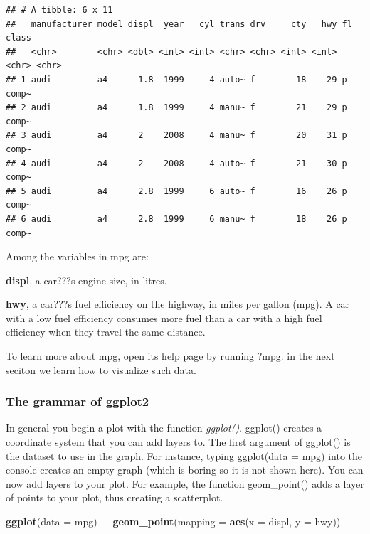 \documentclass[]{article}
\newenvironment{Shaded}{\begin{snugshade}}{\end{snugshade}}
\newcommand{\DataTypeTok}[1]{\textcolor[rgb]{0.13,0.29,0.53}{#1}}
\newcommand{\KeywordTok}[1]{\textcolor[rgb]{0.13,0.29,0.53}{\textbf{#1}}}
\newcommand{\NormalTok}[1]{#1}
\newcommand{\OperatorTok}[1]{\textcolor[rgb]{0.81,0.36,0.00}{\textbf{#1}}}
\newcommand{\StringTok}[1]{\textcolor[rgb]{0.31,0.60,0.02}{#1}}
\begin{document}
\begin{verbatim}
## # A tibble: 6 x 11
##   manufacturer model displ  year   cyl trans drv     cty   hwy fl    class
##   <chr>        <chr> <dbl> <int> <int> <chr> <chr> <int> <int> <chr> <chr>
## 1 audi         a4      1.8  1999     4 auto~ f        18    29 p     comp~
## 2 audi         a4      1.8  1999     4 manu~ f        21    29 p     comp~
## 3 audi         a4      2    2008     4 manu~ f        20    31 p     comp~
## 4 audi         a4      2    2008     4 auto~ f        21    30 p     comp~
## 5 audi         a4      2.8  1999     6 auto~ f        16    26 p     comp~
## 6 audi         a4      2.8  1999     6 manu~ f        18    26 p     comp~
\end{verbatim}

Among the variables in mpg are:

\textbf{displ}, a car???s engine size, in litres.

\textbf{hwy}, a car???s fuel efficiency on the highway, in miles per
gallon (mpg). A car with a low fuel efficiency consumes more fuel than a
car with a high fuel efficiency when they travel the same distance.

To learn more about mpg, open its help page by running ?mpg. in the next
seciton we learn how to visualize such data.

\hypertarget{the-grammar-of-ggplot2}{%
\subsubsection{The grammar of ggplot2}\label{the-grammar-of-ggplot2}}

In general you begin a plot with the function \emph{ggplot()}. ggplot()
creates a coordinate system that you can add layers to. The first
argument of ggplot() is the dataset to use in the graph. For instance,
typing ggplot(data = mpg) into the console creates an empty graph (which
is boring so it is not shown here). You can now add layers to your plot.
For example, the function geom\_point() adds a layer of points to your
plot, thus creating a scatterplot.

\begin{Shaded}
\begin{Highlighting}[]
\KeywordTok{ggplot}\NormalTok{(}\DataTypeTok{data =}\NormalTok{ mpg) }\OperatorTok{+}\StringTok{ }
\StringTok{  }\KeywordTok{geom_point}\NormalTok{(}\DataTypeTok{mapping =} \KeywordTok{aes}\NormalTok{(}\DataTypeTok{x =}\NormalTok{ displ, }\DataTypeTok{y =}\NormalTok{ hwy)) }
\end{Highlighting}
\end{Shaded}
\end{document}

